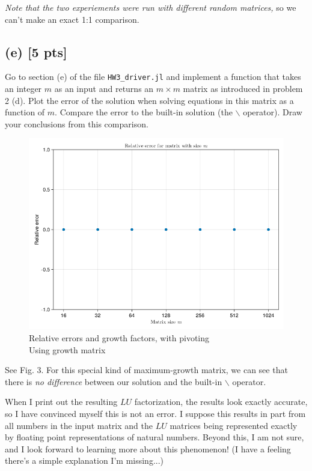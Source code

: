 \documentclass[twoside,10pt]{article}
\begin{document}
\textit{Note that the two experiements were run with different random matrices,} so we can't make an exact 1:1 comparison.

\subsection*{(e) [5 pts]}
Go to section (e) of the file \texttt{HW3\_driver.jl} and implement a function that takes an integer $m$ as an input and returns an $m \times m$ matrix as introduced in problem 2 (d).
Plot the error of the solution when solving equations in this matrix as a function of $m$. 
Compare the error to the built-in solution (the $\backslash$ operator). 
Draw your conclusions from this comparison. 

\begin{figure}[htb]
  \begin{center}
  \includegraphics[width=120mm]{HW3_code/rel_error_and_growth_no_pivot_gm.png}
  \end{center}
  \caption{Relative errors and growth factors, with pivoting\\Using growth matrix}
  \label{fig:figure3}
\end{figure}

\quad See Fig. 3.
For this special kind of maximum-growth matrix, we can see that there is \textit{no difference} between our solution and the built-in $\backslash$ operator.

When I print out the resulting $LU$ factorization, the results look exactly accurate, so I have convinced myself this is not an error.
I suppose this results in part from all numbers in the input matrix and the $LU$ matrices being represented exactly by floating point representations of natural numbers.
Beyond this, I am not sure, and I look forward to learning more about this phenomenon!
(I have a feeling there's a simple explanation I'm missing...)


\end{document}
